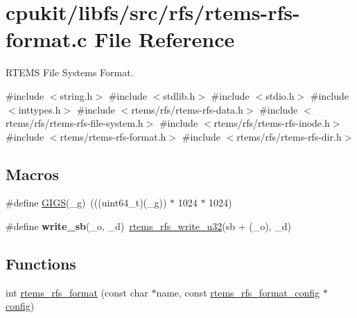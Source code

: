\hypertarget{rtems-rfs-format_8c}{}\section{cpukit/libfs/src/rfs/rtems-\/rfs-\/format.c File Reference}
\label{rtems-rfs-format_8c}


R\+T\+E\+MS File Systems Format.  


{\ttfamily \#include $<$string.\+h$>$}\newline
{\ttfamily \#include $<$stdlib.\+h$>$}\newline
{\ttfamily \#include $<$stdio.\+h$>$}\newline
{\ttfamily \#include $<$inttypes.\+h$>$}\newline
{\ttfamily \#include $<$rtems/rfs/rtems-\/rfs-\/data.\+h$>$}\newline
{\ttfamily \#include $<$rtems/rfs/rtems-\/rfs-\/file-\/system.\+h$>$}\newline
{\ttfamily \#include $<$rtems/rfs/rtems-\/rfs-\/inode.\+h$>$}\newline
{\ttfamily \#include $<$rtems/rtems-\/rfs-\/format.\+h$>$}\newline
{\ttfamily \#include $<$rtems/rfs/rtems-\/rfs-\/dir.\+h$>$}\newline
\subsection*{Macros}
\begin{DoxyCompactItemize}
\item 
\#define \mbox{\hyperlink{rtems-rfs-format_8c_a599d21ff3908f21b90c1d812a0d27b98}{G\+I\+GS}}(\+\_\+g)~(((uint64\+\_\+t)(\+\_\+g)) $\ast$ 1024 $\ast$ 1024)
\item 
\mbox{\label{rtems-rfs-format_8c_a2d369182fb0d1c09d6ae4f549e5ed421}} 
\#define {\bfseries write\+\_\+sb}(\+\_\+o,  \+\_\+d)~\mbox{\hyperlink{rtems-rfs-data_8h_a0e7b57b15dac03868caaeb7d2c8c1ba7}{rtems\+\_\+rfs\+\_\+write\+\_\+u32}}(sb + (\+\_\+o), \+\_\+d)
\end{DoxyCompactItemize}
\subsection*{Functions}
\begin{DoxyCompactItemize}
\item 
int \mbox{\hyperlink{rtems-rfs-format_8c_a56f021e1569663ecb2f46921a35e1a17}{rtems\+\_\+rfs\+\_\+format}} (const char $\ast$name, const \mbox{\hyperlink{rtems-rfs-format_8h_a89d46e05dca9605cef445458620bb003}{rtems\+\_\+rfs\+\_\+format\+\_\+config}} $\ast$\mbox{\hyperlink{structconfig__s}{config}})
\end{DoxyCompactItemize}


